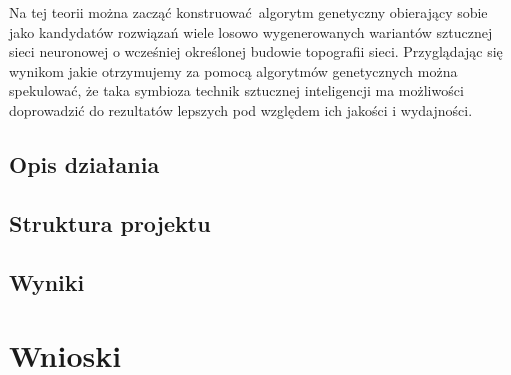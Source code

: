 \documentclass[12pt, oneside, a4paper]{report}
\begin{document}
Na tej teorii można zacząć konstruować algorytm genetyczny obierający sobie jako kandydatów rozwiązań wiele losowo wygenerowanych wariantów sztucznej sieci neuronowej o wcześniej określonej budowie topografii sieci. Przyglądając się wynikom jakie otrzymujemy za pomocą algorytmów genetycznych można spekulować, że taka symbioza technik sztucznej inteligencji ma możliwości doprowadzić do rezultatów lepszych pod względem ich jakości i wydajności.
\section{Opis działania}
\section{Struktura projektu}
\section{Wyniki}


\chapter{Wnioski}

\pagebreak


\end{document}
